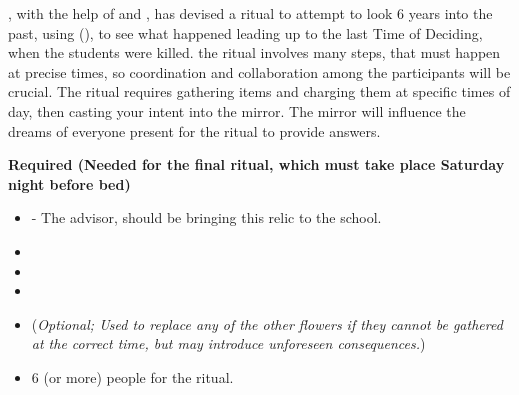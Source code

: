 \documentclass[green]{GL2020}
\begin{document}
\name{\gWhatHappenedSixYearsAgo{}}

\cPresident{}, with the help of \cLibAssist{} and \cHeir{}, has devised a ritual to attempt to look 6 years into the past, using \iMirror{\MYname} (\iMirror{\MYnumber}),  to see what happened leading up to the last Time of Deciding, when the students were killed. the ritual involves many steps, that must happen at precise times, so coordination and collaboration among the participants will be crucial. The ritual requires gathering items and charging them at specific times of day, then casting your intent into the mirror. The mirror will influence the dreams of everyone present for the ritual to provide answers.

\textbf{Required (Needed for the final ritual, which must take place Saturday night before bed)}
\begin{itemize}
  \item \iMirror{} - The \pTech{} advisor, \cDiplomat{\full} should be bringing this relic to the school.
  \item \iMorningGlory{}
  \item \iLily{}
  \item \iBlackCrocus{}
  \item \iStoneFlower{} (\emph{Optional; Used to replace any of the other flowers if they cannot be gathered at the correct time, but may introduce unforeseen consequences.})
  \item 6 (or more) people for the ritual.
\end{itemize}
\end{document}
